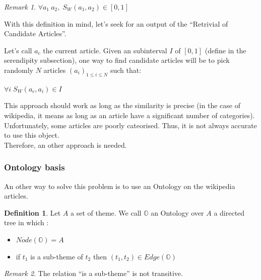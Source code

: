 \documentclass[11pt]{article}
\theoremstyle{plain}
\theoremstyle{definition}
\newtheorem{defn}{Definition}[section]
\theoremstyle{remark}
\newtheorem*{rem}{Remark}
\begin{document}
\begin{rem}
  $\forall a_1\: a_2,\; S_W(a_1,a_2) \in [0,1]$
\end{rem}

\vspace*{5mm}
With this definition in mind, let's seek for an output of the ``Retrivial of Candidate Articles''.


Let's call $a_c$ the current article.
Given an subinterval $I$ of $[0,1]$ (define in the serendipity subsection), one way to find candidate articles will be to pick randomly $N$ articles $(a_i)_{1 \leq i \leq N}$ such that:
\begin{center}
  $\forall i \; S_W(a_c,a_i) \in I$
\end{center}

\vspace*{5mm}
This approach should work as long as the similarity is precise (in the case of wikipedia, it means as long as an article have a significant number of categories). Unfortunately, some articles are poorly cateorised. Thus, it is not always accurate to use this object.\\
Therefore, an other approach is needed.






\subsubsection{Ontology basis}

An other way to solve this problem is to use an Ontology on the wikipedia articles.

\vspace*{5mm}
\begin{defn}
  Let $A$ a set of theme. We call $\mathbb{O}$ an Ontology over $A$ a directed tree in which :
  \begin{itemize}
  \item $ Node(\mathbb{O}) = A$
  \item if $t_1$ is a sub-theme of $t_2$ then $(t_1,t_2) \in Edge(\mathbb{O})$
  \end{itemize}
\end{defn}

\vspace*{5mm}

\begin{rem}
  The relation ``is a sub-theme'' is not transitive.
\end{rem}
\end{document}

